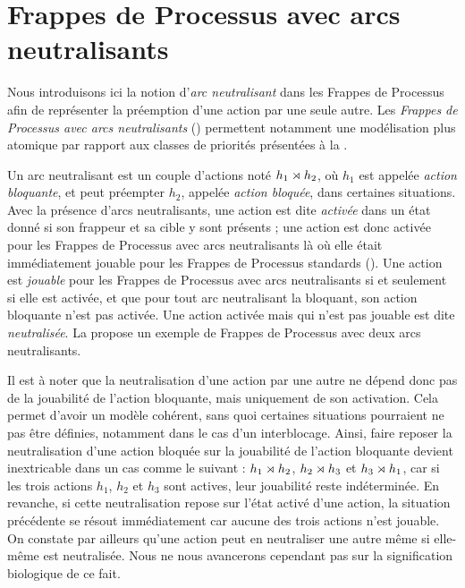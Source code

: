 \section{Frappes de Processus avec arcs neutralisants}

Nous introduisons ici la notion d'\emph{arc neutralisant} dans les Frappes de Processus
afin de représenter la préemption d'une action par une seule autre.
Les \emph{Frappes de Processus avec arcs neutralisants} ()
permettent notamment une modélisation plus atomique
par rapport aux classes de priorités présentées à la .

\myskip

Un arc neutralisant est un couple d'actions noté $h_1\rtimes h_2$,
où $h_1$ est appelée \emph{action bloquante},
et peut préempter $h_2$, appelée \emph{action bloquée},
dans certaines situations.
Avec la présence d'arcs neutralisants, une action est dite \emph{activée} dans un état donné si
son frappeur et sa cible y sont présents ;
une action est donc activée pour les Frappes de Processus avec arcs neutralisants
là où elle était immédiatement jouable pour les Frappes de Processus standards ().
Une action est \emph{jouable} pour les Frappes de Processus avec arcs neutralisants
si et seulement si elle est activée,
et que pour tout arc neutralisant la bloquant, son action bloquante n'est pas activée.
Une action activée mais qui n'est pas jouable est dite \emph{neutralisée}.
La  propose un exemple de Frappes de Processus avec deux arcs neutralisants.

Il est à noter que la neutralisation d'une action par une autre ne dépend donc pas de la jouabilité
de l'action bloquante, mais uniquement de son activation.
Cela permet d'avoir un modèle cohérent, sans quoi certaines situations pourraient ne pas être
définies, notamment dans le cas d'un interblocage.
Ainsi, faire reposer la neutralisation d'une action bloquée sur la jouabilité de l'action bloquante
devient inextricable dans un cas comme le suivant :
$h_1\rtimes h_2$, $h_2\rtimes h_3$ et $h_3\rtimes h_1$,
car si les trois actions $h_1$, $h_2$ et $h_3$ sont actives, leur jouabilité reste indéterminée.
En revanche, si cette neutralisation repose sur l'état activé d'une action,
la situation précédente se résout immédiatement car aucune des trois actions n'est jouable.
On constate par ailleurs qu'une action peut en neutraliser une autre
même si elle-même est neutralisée.
Nous ne nous avancerons cependant pas sur la signification biologique de ce fait.

